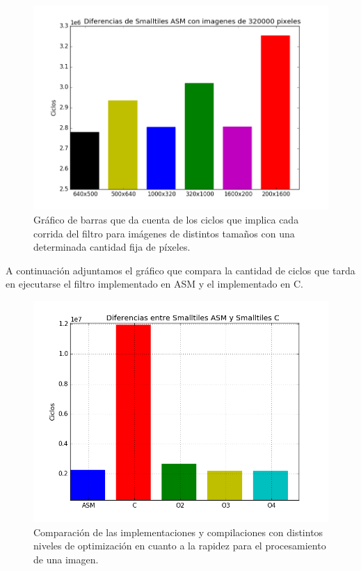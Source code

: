 \begin{figure}[h!]
\centering
\includegraphics[width = 15 cm, height = 8 cm]{imagenes/distintostamanos.png}
\caption[center]{Gráfico de barras que da cuenta de los ciclos que implica cada corrida del filtro para imágenes de distintos tamaños con una determinada cantidad fija de píxeles.}
\end{figure}
	
	A continuación adjuntamos el gráfico que compara la cantidad de ciclos que tarda en ejecutarse el filtro implementado en ASM y el implementado en C.

\begin{figure}[h!]
\centering
\includegraphics[width = 15 cm, height = 8 cm]{imagenes/ASMvsCSmalltiles.png}
\caption[center]{Comparación de las implementaciones y compilaciones con distintos niveles de optimización en cuanto a la rapidez para el procesamiento de una imagen.}
\end{figure}
	